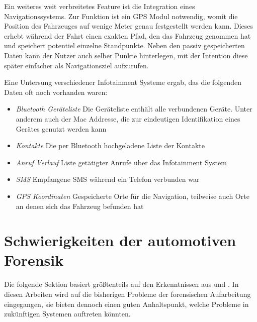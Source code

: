 \documentclass[conference,compsoc,final,a4paper]{IEEEtran}
\begin{document}
Ein weiteres weit verbreitetes Feature ist die Integration eines Navigationssystems.
Zur Funktion ist ein \ac{GPS} Modul notwendig, womit die Position des Fahrzeuges auf wenige Meter genau festgestellt werden kann.
Dieses erhebt während der Fahrt einen exakten Pfad, den das Fahrzeug genommen hat und speichert potentiel einzelne Standpunkte.
Neben den passiv gespeicherten Daten kann der Nutzer auch selber Punkte hinterlegen, mit der Intention diese später einfacher als 
Navigationsziel aufzurufen.

Eine Untersung verschiedener Infotainment Systeme ergab, das die folgenden Daten oft noch vorhanden waren:~\cite{Lacroix2017}
\begin{itemize}
  \item \emph{Bluetooth Geräteliste} Die Geräteliste enthält alle verbundenen Geräte. Unter anderem auch der Mac Addresse, die zur eindeutigen Identifikation eines Gerätes genutzt werden kann
  \item \emph{Kontakte} Die per Bluetooth hochgeladene Liste der Kontakte
  \item \emph{Anruf Verlauf} Liste getätigter Anrufe über das Infotainment System
  \item \emph{SMS} Empfangene SMS während ein Telefon verbunden war
  \item \emph{GPS Koordinaten} Gespeicherte Orte für die Navigation, teilweise auch Orte an denen sich das Fahrzeug befunden hat
\end{itemize}

\section{Schwierigkeiten der automotiven Forensik}

Die folgende Sektion basiert größtenteils auf den Erkenntnissen aus \cite{Kopencova_2020} und \cite{LeKhac2020}.
In diesen Arbeiten wird auf die bisherigen Probleme der forensischen Aufarbeitung eingegangen, sie bieten dennoch einen guten Anhaltspunkt,
welche Probleme in zukünftigen Systemen auftreten könnten.\\
\end{document}
